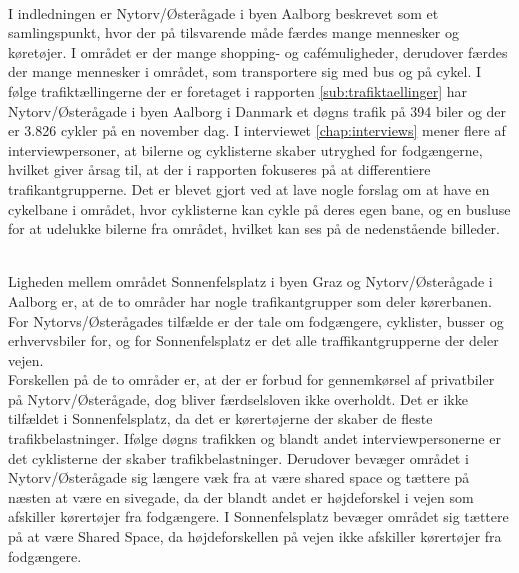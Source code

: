 ~\\
I indledningen er Nytorv/Østerågade i byen Aalborg beskrevet som et samlingspunkt, hvor der på tilsvarende måde færdes mange mennesker og køretøjer. I området er der mange shopping- og cafémuligheder, derudover færdes der mange mennesker i området, som transportere sig med bus og på cykel. I følge trafiktællingerne der er foretaget i rapporten \cref{sub:trafiktaellinger} har Nytorv/Østerågade i byen Aalborg i Danmark et døgns trafik på 394 biler og der er 3.826 cykler på en november dag. I interviewet \cref{chap:interviews} mener flere af interviewpersoner, at bilerne og cyklisterne skaber utryghed for fodgængerne, hvilket giver årsag til, at der i rapporten fokuseres på at differentiere trafikantgrupperne. Det er blevet gjort ved at lave nogle forslag om at have en cykelbane i området, hvor cyklisterne kan cykle på deres egen bane, og en busluse for at udelukke bilerne fra området, hvilket kan ses på de nedenstående billeder.

~\\
Ligheden mellem området Sonnenfelsplatz i byen Graz og Nytorv/Østerågade i Aalborg er, at de to områder har nogle trafikantgrupper som deler kørerbanen. For Nytorvs/Østerågades tilfælde er der tale om fodgængere, cyklister, busser og erhvervsbiler for, og for Sonnenfelsplatz er det alle traffikantgrupperne der deler vejen.
~\\
Forskellen på de to områder er, at der er forbud for gennemkørsel af privatbiler på Nytorv/Østerågade, dog bliver færdselsloven ikke overholdt. Det er ikke tilfældet i Sonnenfelsplatz, da det er kørertøjerne der skaber de fleste trafikbelastninger. Ifølge døgns trafikken og blandt andet interviewpersonerne er det cyklisterne der skaber trafikbelastninger. Derudover bevæger området i Nytorv/Østerågade sig længere væk fra at være shared space og tættere på næsten at være en sivegade, da der blandt andet er højdeforskel i vejen som afskiller kørertøjer fra fodgængere. I Sonnenfelsplatz bevæger området sig tættere på at være Shared Space, da højdeforskellen på vejen ikke afskiller kørertøjer fra fodgængere.
